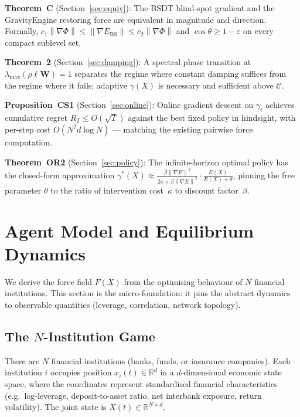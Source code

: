 \documentclass[11pt]{article}
\theoremstyle{definition}
\newcommand{\R}{\mathbb{R}}
\newcommand{\grad}{\nabla}
\newcommand{\Ebs}{E_{\mathrm{BS}}}
\newcommand{\Cman}{\mathcal{C}}
\newcommand{\lmax}{\lambda_{\max}}
\newcommand{\norm}[1]{\left\|#1\right\|}
\newcommand{\costheta}{\cos\theta}
\begin{document}
\begin{tcolorbox}[title=\textbf{Mathematical Overview}, colframe=blue!40!black,
                  colback=blue!5!white, breakable]
\textbf{Theorem~C} (Section~\ref{sec:equiv}): The BSDT blind-spot gradient and the
GravityEngine restoring force are equivalent in magnitude and direction.
Formally, $c_1\norm{\grad\Phi}\le\norm{\grad\Ebs}\le c_2\norm{\grad\Phi}$ and
$\costheta \ge 1 - \varepsilon$ on every compact sublevel set.

\smallskip
\textbf{Theorem~2} (Section~\ref{sec:damping}): A spectral phase transition at
$\lmax(\rho\ell\mathbf{W}) = 1$ separates the regime where constant damping
suffices from the regime where it fails; adaptive $\gamma(X)$ is necessary and
sufficient above $\Cman$.

\smallskip
\textbf{Proposition~CS1} (Section~\ref{sec:online}): Online gradient descent on
$\gamma_t$ achieves cumulative regret $R_T \le O(\sqrt{T})$ against the best fixed
policy in hindsight, with per-step cost $O(N^2 d \log N)$ — matching the existing
pairwise force computation.

\smallskip
\textbf{Theorem~OR2} (Section~\ref{sec:policy}): The infinite-horizon optimal
policy has the closed-form approximation
$\gamma^*(X) \approx \tfrac{\beta\norm{\grad E}^2}{2\kappa+\beta\norm{\grad E}^2}
\cdot \tfrac{E(X)}{E(X)+\theta}$,
pinning the free parameter $\theta$ to the ratio of intervention cost~$\kappa$
to discount factor~$\beta$.
\end{tcolorbox}

\section{Agent Model and Equilibrium Dynamics}
\label{sec:model}

We derive the force field $F(X)$ from the optimising behaviour of $N$ financial
institutions.  This section is the micro-foundation: it pins the abstract
dynamics to observable quantities (leverage, correlation, network topology).

\subsection{The $N$-Institution Game}

There are $N$ financial institutions (banks, funds, or insurance companies).
Each institution $i$ occupies position $x_i(t) \in \R^d$ in a $d$-dimensional
economic state space, where the coordinates represent standardised financial
characteristics (e.g.\ log-leverage, deposit-to-asset ratio, net interbank
exposure, return volatility).  The joint state is $X(t) \in \R^{N \times d}$.
\end{document}
